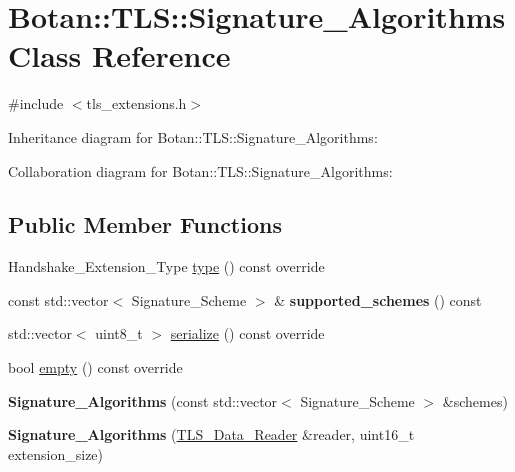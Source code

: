 \hypertarget{class_botan_1_1_t_l_s_1_1_signature___algorithms}{}\section{Botan\+:\+:T\+LS\+:\+:Signature\+\_\+\+Algorithms Class Reference}
\label{class_botan_1_1_t_l_s_1_1_signature___algorithms}


{\ttfamily \#include $<$tls\+\_\+extensions.\+h$>$}



Inheritance diagram for Botan\+:\+:T\+LS\+:\+:Signature\+\_\+\+Algorithms\+:


Collaboration diagram for Botan\+:\+:T\+LS\+:\+:Signature\+\_\+\+Algorithms\+:
\subsection*{Public Member Functions}
\begin{DoxyCompactItemize}
\item 
Handshake\+\_\+\+Extension\+\_\+\+Type \mbox{\hyperlink{class_botan_1_1_t_l_s_1_1_signature___algorithms_a9a316f000ee5c6eb181e6109bbc40b55}{type}} () const override
\item 
\mbox{\label{class_botan_1_1_t_l_s_1_1_signature___algorithms_a226e194c58f4b78c0ff22a275dc17c95}} 
const std\+::vector$<$ Signature\+\_\+\+Scheme $>$ \& {\bfseries supported\+\_\+schemes} () const
\item 
std\+::vector$<$ uint8\+\_\+t $>$ \mbox{\hyperlink{class_botan_1_1_t_l_s_1_1_signature___algorithms_ac94e8e1fd0adbeeb18e318ea5ce83c40}{serialize}} () const override
\item 
bool \mbox{\hyperlink{class_botan_1_1_t_l_s_1_1_signature___algorithms_a7216e44527a194bebce7d616d6d3fe62}{empty}} () const override
\item 
\mbox{\label{class_botan_1_1_t_l_s_1_1_signature___algorithms_a3c88a6815d89dc085d44d9aafb186e89}} 
{\bfseries Signature\+\_\+\+Algorithms} (const std\+::vector$<$ Signature\+\_\+\+Scheme $>$ \&schemes)
\item 
\mbox{\label{class_botan_1_1_t_l_s_1_1_signature___algorithms_a83f618cfa1f709bd284dfd838421394d}} 
{\bfseries Signature\+\_\+\+Algorithms} (\mbox{\hyperlink{class_botan_1_1_t_l_s_1_1_t_l_s___data___reader}{T\+L\+S\+\_\+\+Data\+\_\+\+Reader}} \&reader, uint16\+\_\+t extension\+\_\+size)
\end{DoxyCompactItemize}
